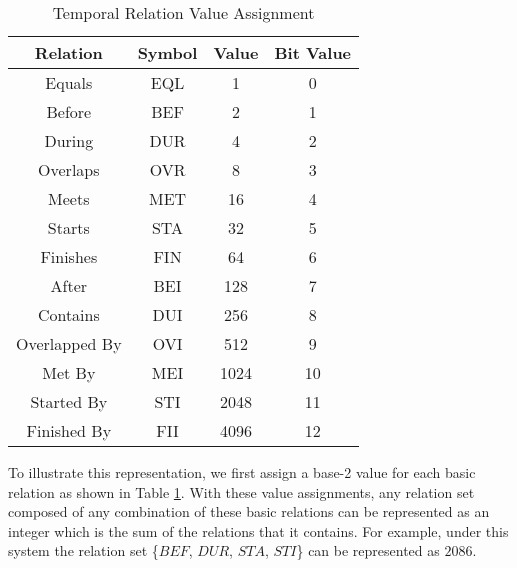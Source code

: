 \documentclass[11pt]{report}
\begin{document}
          \begin{table}[tbhp]
            \begin{center}
              \begin{tabular}[t]{|c|c|c|c|}
                \hline
                {\bf Relation} & {\bf Symbol} & {\bf Value} & {\bf Bit Value} \\
                \hline
                Equals        & EQL &    1 &  0 \\
                \hline
                Before        & BEF &    2 &  1 \\
                \hline
                During        & DUR &    4 &  2 \\
                \hline
                Overlaps      & OVR &    8 &  3 \\
                \hline
                Meets         & MET &   16 &  4 \\
                \hline
                Starts        & STA &   32 &  5 \\
                \hline
                Finishes      & FIN &   64 &  6 \\
                \hline
                After         & BEI &  128 &  7 \\
                \hline
                Contains      & DUI &  256 &  8 \\
                \hline
                Overlapped By & OVI &  512 &  9 \\
                \hline
                Met By        & MEI & 1024 & 10 \\
                \hline
                Started By    & STI & 2048 & 11 \\
                \hline
                Finished By   & FII & 4096 & 12 \\
                \hline
              \end{tabular}
            \end{center}
            \caption{Temporal Relation Value Assignment}
            \label{tabl-impln-valas}
          \end{table}

          To illustrate this representation, we first assign a base-2 value
          for each basic relation as shown in Table \ref{tabl-impln-valas}.
          With these value assignments, any relation set composed of any
          combination of these basic relations can be represented as an integer
          which is the sum of the relations that it contains. For example,
          under this system the relation set \{$BEF$, $DUR$, $STA$, $STI$\} can
          be represented as $2086$.
\end{document}
